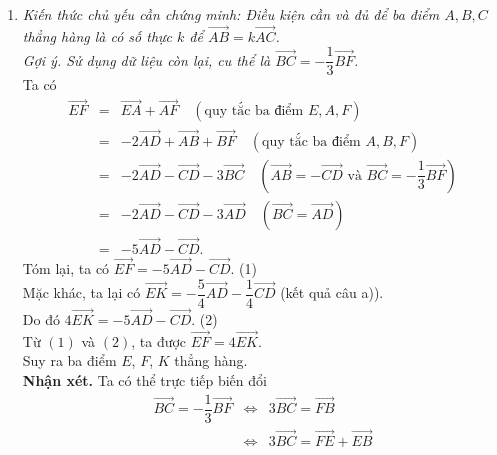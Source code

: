 \begin{bt}
{\begin{enumerate}
\begin{eqnarray*}
	& =&-\dfrac{5}{4} \overrightarrow{A D}-\dfrac{1}{4} \overrightarrow{C D} .
	\end{eqnarray*}
	Tóm lại, $\overrightarrow{E K}=-\dfrac{5}{4} \overrightarrow{A D}-\dfrac{1}{4} \overrightarrow{C D}$.
\item {\it Kiến thức chủ yếu cần chứng minh: Điều kiện cần và đủ để ba điểm $A, B, C$ thẳng hàng là có số thực $k$ để $\overrightarrow{A B}=k \overrightarrow{A C}$.\\
	Gợi ý. Sử dụng dữ liệu còn lại, cu thể là $\overrightarrow{B C}=-\dfrac{1}{3} \overrightarrow{B F}$.}\\
	Ta có 
	\allowdisplaybreaks
\begin{eqnarray*}
	\overrightarrow{E F}&=&\overrightarrow{E A}+\overrightarrow{A F} \quad
	(\text{quy tắc ba điểm }E, A, F)\\
	& =&-2 \overrightarrow{A D}+\overrightarrow{A B}+\overrightarrow{B F} \quad (\text{quy tắc ba điểm } A, B, F) \\
	& =&-2 \overrightarrow{A D}-\overrightarrow{C D}-3 \overrightarrow{B C} \quad \left(\overrightarrow{A B}=-\overrightarrow{C D} \text{ và } \overrightarrow{B C}=-\dfrac{1}{3} \overrightarrow{B F}\right) \\
	& =&-2 \overrightarrow{A D}-\overrightarrow{C D}-3 \overrightarrow{A D} \quad(\overrightarrow{B C}=\overrightarrow{A D}) \\
	& =&-5 \overrightarrow{A D}-\overrightarrow{C D}.
	\end{eqnarray*}
	Tóm lại, ta có $\overrightarrow{E F}=-5 \overrightarrow{A D}-\overrightarrow{C D}$. \hfill{(1)}\\	
	Mặc khác, ta lại có $\overrightarrow{E K}=-\dfrac{5}{4} \overrightarrow{A D}-\dfrac{1}{4} \overrightarrow{C D}$ (kết quả câu a)).\\
	Do đó $4 \overrightarrow{E K}=-5 \overrightarrow{A D}-\overrightarrow{C D}$. \hfill{(2)}\\	
	Từ $(1)$ và $(2)$, ta được $\overrightarrow{E F}=4 \overrightarrow{E K}$.\\
	Suy ra ba điểm $E$, $F$, $K$ thẳng hàng.\\
	{\bf Nhận xét.} Ta có thể trực tiếp biến đổi 
	\allowdisplaybreaks
\begin{eqnarray*}
	\overrightarrow{B C}=-\dfrac{1}{3} \overrightarrow{B F}
	& \Leftrightarrow& 3 \overrightarrow{B C}=\overrightarrow{F B} \\
	& \Leftrightarrow& 3 \overrightarrow{B C}=\overrightarrow{F E}+\overrightarrow{E B} \\

\end{eqnarray*}
\end{enumerate}}
\end{bt}
